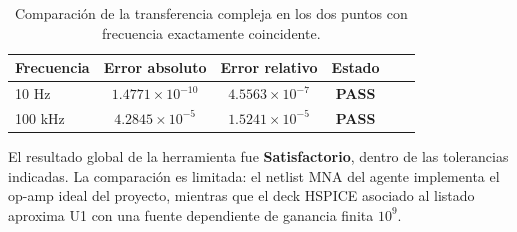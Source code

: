 \begin{table}[H]
\centering
\begin{tabular}{lccccc}
\toprule
Frecuencia & Error absoluto & Error relativo & Estado \\
\midrule
10 Hz
& $1.4771\times10^{-10}$
& $4.5563\times10^{-7}$
& \textbf{PASS} \\

100 kHz
& $4.2845\times10^{-5}$
& $1.5241\times10^{-5}$
& \textbf{PASS} \\
\bottomrule
\end{tabular}


\caption{Comparación de la transferencia compleja en los dos puntos con frecuencia exactamente coincidente.}
\end{table}


El resultado global de la herramienta fue \textbf{Satisfactorio}, dentro de las tolerancias indicadas. La comparaci\'on es limitada: el netlist MNA del agente implementa el op-amp ideal del proyecto, mientras que el deck HSPICE asociado al listado aproxima U1 con una fuente dependiente de ganancia finita $10^9$.